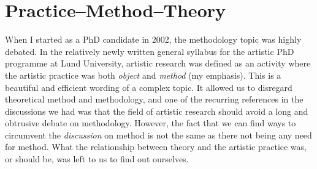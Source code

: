 \documentclass[12pt]{article}
\begin{document}



\section*{Practice--Method--Theory}
\label{sec:error}

When I started as a PhD candidate in 2002, the methodology topic was highly debated. In the relatively newly written general syllabus for the artistic PhD programme at Lund University, artistic research was defined as an activity where the artistic practice was both \emph{object} and \emph{method} (my emphasis). This is a beautiful and efficient wording of a complex topic. It allowed us to disregard theoretical method and methodology, and one of the recurring references in the discussions we had was that the field of artistic research should avoid a long and obtrusive debate on methodology. However, the fact that we can find ways to circumvent the \emph{discussion} on method is not the same as there not being any need for method. What the relationship between theory and the artistic practice was, or should be, was left to us to find out ourselves.

\end{document}
